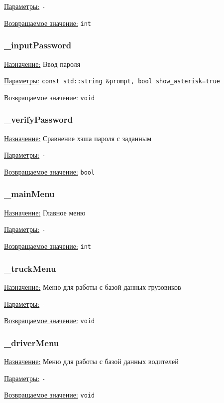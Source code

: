 \underline{Параметры:} \verb|-|

\underline{Возвращаемое значение:} \verb|int|


\subsubsection{\_inputPassword}

\underline{Назначение:} Ввод пароля

\underline{Параметры:} 
\verb|const std::string &prompt, bool show_asterisk=true|

\underline{Возвращаемое значение:} \verb|void|


\subsubsection{\_verifyPassword}

\underline{Назначение:} Сравнение хэша пароля с заданным

\underline{Параметры:} \verb|-|

\underline{Возвращаемое значение:} \verb|bool|


\subsubsection{\_mainMenu}

\underline{Назначение:} Главное меню

\underline{Параметры:} \verb|-|

\underline{Возвращаемое значение:} \verb|int|


\subsubsection{\_truckMenu}

\underline{Назначение:} Меню для работы с базой данных грузовиков

\underline{Параметры:} \verb|-|

\underline{Возвращаемое значение:} \verb|void|


\subsubsection{\_driverMenu}

\underline{Назначение:} Меню для работы с базой данных водителей

\underline{Параметры:} \verb|-|

\underline{Возвращаемое значение:} \verb|void|


